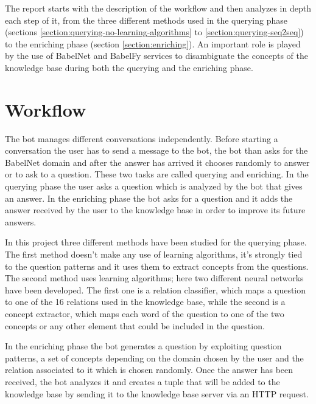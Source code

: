 \documentclass[paper=a4, fontsize=11pt]{scrartcl} %
\numberwithin{equation}{section} %
\numberwithin{figure}{section} %
\numberwithin{table}{section} %
\theoremstyle{definition}
\begin{document}
The report starts with the description of the workflow and then analyzes in
depth each step of it,
from the three different methods used in the querying phase
(sections \ref{section:querying-no-learning-algorithms} to \ref{section:querying-seq2seq})
to the enriching phase (section \ref{section:enriching}). An important role
is played by the use of BabelNet and BabelFy services to disambiguate the
concepts of the knowledge base during both the querying and the enriching
phase.


\section{Workflow}
\label{section:workflow}

The bot manages different conversations independently. Before starting a
conversation the user has to send a message to the bot, the bot than asks
for the BabelNet domain and after the answer has arrived it chooses randomly
to answer or to ask to a question. These two tasks are called querying and
enriching.
In the querying phase the user asks a question which is analyzed by the bot
that gives an answer. In the enriching phase the bot asks for a question and it
adds the answer received by the user to the knowledge base in order to improve
its future answers.

In this project three different methods have been studied for the querying
phase. The first method doesn't make any use of learning algorithms, it's
strongly tied to the question patterns and it uses them
to extract concepts from the questions. The second method uses learning
algorithms; here two different neural networks have been developed.
The first one is a relation classifier, which maps a question to one of the
16 relations used in the knowledge base, while the second is a concept extractor,
which maps each word of the question to one of the two concepts or any other
element that could be included in the question.

In the enriching phase the bot generates a question by exploiting question
patterns, a set of concepts depending on the domain chosen by the user and
the relation associated to it which is chosen randomly. Once the answer has been
received, the bot analyzes it and creates a tuple that will be added to the
knowledge base by sending it to the knowledge base server via an HTTP request.
\end{document}
